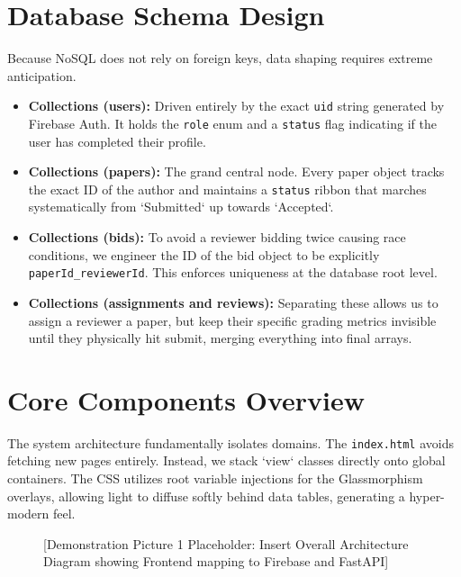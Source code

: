 \documentclass[12pt,a4paper]{report}
\begin{document}
\section{Database Schema Design}
Because NoSQL does not rely on foreign keys, data shaping requires extreme anticipation. 

\begin{itemize}
    \item \textbf{Collections (users):} Driven entirely by the exact \texttt{uid} string generated by Firebase Auth. It holds the \texttt{role} enum and a \texttt{status} flag indicating if the user has completed their profile.
    \item \textbf{Collections (papers):} The grand central node. Every paper object tracks the exact ID of the author and maintains a \texttt{status} ribbon that marches systematically from `Submitted` up towards `Accepted`.
    \item \textbf{Collections (bids):} To avoid a reviewer bidding twice causing race conditions, we engineer the ID of the bid object to be explicitly \texttt{paperId\_reviewerId}. This enforces uniqueness at the database root level.
    \item \textbf{Collections (assignments and reviews):} Separating these allows us to assign a reviewer a paper, but keep their specific grading metrics invisible until they physically hit submit, merging everything into final arrays.
\end{itemize}

\section{Core Components Overview}
The system architecture fundamentally isolates domains. The \texttt{index.html} avoids fetching new pages entirely. Instead, we stack `view` classes directly onto global containers. The CSS utilizes root variable injections for the Glassmorphism overlays, allowing light to diffuse softly behind data tables, generating a hyper-modern feel.

\begin{figure}[htbp]
    \centering
    \vspace{5cm}
    \caption{[Demonstration Picture 1 Placeholder: Insert Overall Architecture Diagram showing Frontend mapping to Firebase and FastAPI]}
    \label{fig:architecture}
\end{figure}
\end{document}
